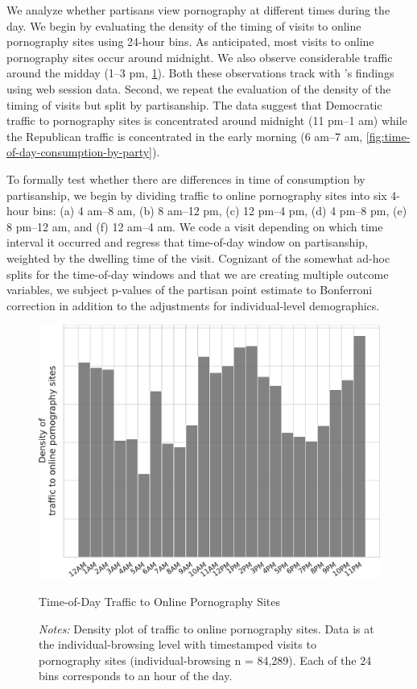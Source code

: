 \documentclass[12pt,twoside]{article}
\begin{document}
We analyze whether partisans view pornography at different times during the day. We begin by evaluating the density of the timing of visits to online pornography sites using 24-hour bins. As anticipated, most visits to online pornography sites occur around midnight. We also observe considerable traffic around the midday (1--3 pm, \cref{fig:time-of-day-consumption}). Both these observations track with \cite{webporn}'s findings using web session data. Second, we repeat the evaluation of the density of the timing of visits but split by partisanship. The data suggest that Democratic traffic to pornography sites is concentrated around midnight (11 pm--1 am) while the Republican traffic is concentrated in the early morning (6 am--7 am, \cref{fig:time-of-day-consumption-by-party}).

To formally test whether there are differences in time of consumption by partisanship, we begin by dividing traffic to online pornography sites into six 4-hour bins: (a) 4 am--8 am, (b) 8 am--12 pm, (c) 12 pm--4 pm, (d) 4 pm--8 pm, (e) 8 pm--12 am, and (f) 12 am--4 am. We code a visit depending on which time interval it occurred and regress that time-of-day window on partisanship, weighted by the dwelling time of the visit. Cognizant of the somewhat ad-hoc splits for the time-of-day windows and that we are creating multiple outcome variables, we subject p-values of the partisan point estimate to Bonferroni correction in addition to the adjustments for individual-level demographics.

\begin{figure}[ht]
\centering
    \includegraphics[width=.75\linewidth]{figs/time-of-day-consumption.pdf}
\caption{Time-of-Day Traffic to Online Pornography Sites}
\caption*{\footnotesize \emph{Notes:} 
        Density plot of traffic to online pornography sites.
        Data is at the individual-browsing level with timestamped visits to pornography sites (individual-browsing n = 84,289).
        Each of the 24 bins corresponds to an hour of the day.
	}
    \label{fig:time-of-day-consumption}
\end{figure}
\end{document}

